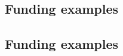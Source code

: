 \documentclass[12pt, a4paper]{article}
\begin{document}
    \subsection*{Funding examples}
    \begin{center}
    \scalebox{0.9}{%
        \begin{tikzpicture}
            
        \end{tikzpicture}
    }
    \end{center}

    \subsection*{Funding examples}
    \begin{center}
    \scalebox{0.9}{%
        \begin{tikzpicture}
            
        \end{tikzpicture}
    }
    \end{center}
\end{document}
